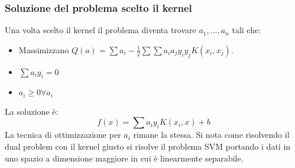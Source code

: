 		\subsubsection{Soluzione del problema scelto il kernel}
		Una volta scelto il kernel il problema diventa trovare $a_1,\dots,a_n$ tali che:
		\begin{itemize}
			\item Massimizzano $Q(a) = \sum a_i-\frac{1}{2}\sum\sum a_ia_jy_iy_jK(x_i,x_j)$.
			\item $\sum a_iy_i = 0$
			\item $a_i\ge 0\forall a_i$
		\end{itemize}
		La soluzione \`e:
		$$f(x) = \sum a_iy_iK(x_i,x)+b$$
		La tecnica di ottimizzazione per $a_i$ rimane la stessa.
		Si nota come risolvendo il dual problem con il kernel giusto si risolve il problema SVM portando i dati in uno spazio a dimensione maggiore in cui \`e linearmente separabile.

